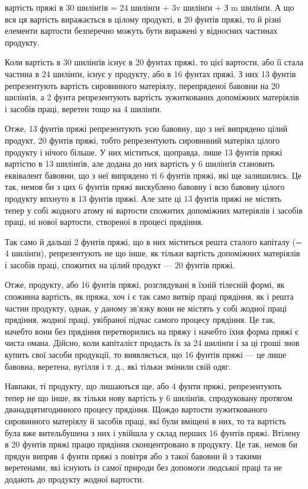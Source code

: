 вартість пряжі в 30 шилінґів = 24 шилінґи + 3v шилінґи + З m шилінґи. А що вся ця вартість
виражається в цілому продукті, в 20 фунтів пряжі, то й різні елементи вартости безперечно можуть
бути
виражені у відносних частинах продукту.

Коли вартість в 30 шилінґів існує в 20 фунтах пряжі, то  цієї вартости, або її стала частина в
24 шилінґи, існує у  продукту, або в 16 фунтах пряжі. З них 13 фунтів репрезентують вартість
сировинного матеріялу, перепряденої бавовни на 20 шилінґів, а 2 фунта репрезентують вартість
зужиткованих допоміжних матеріялів і засобів праці, веретен тощо на 4 шилінґи.

Отже, 13 фунтів пряжі репрезентують усю бавовну, що з неї випрядено цілий продукт, 20 фунтів
пряжі, тобто репрезентують сировинний матеріял цілого продукту і нічого більше. У них міститься,
щоправда, лише 13 фунтів пряжі вартістю в 13 шилінґів, але додана до них вартість у 6
шилінґів становить еквівалент бавовни, що з неї випрядено ті 6 фунтів пряжі, які ще залишились.
Це так, немов би з цих 6 фунтів пряжі вискублено бавовну і всю бавовну цілого продукту впхнуто в
13 фунтів пряжі. Але зате ці 13 фунтів пряжі не містять тепер у собі жодного атому ні
вартости спожитих допоміжних матеріялів і засобів праці, ні нової вартости, створеної в процесі
прядіння.

Так само й дальші 2 фунтів пряжі, що в них міститься решта сталого капіталу (= 4 шилінґи),
репрезентують не що інше, як
тільки вартість допоміжних матеріялів і засобів праці, спожитих на цілий продукт — 20 фунтів пряжі.

Отже,  продукту, або 16 фунтів пряжі, розглядувані в їхній тілесній формі, як споживна вартість,
як пряжа, хоч і
є так само витвір праці прядіння, як і решта частин продукту, однак, у даному зв’язку вони не
містять у собі жодної праці прядіння, жодної праці, увібраної підчас самого процесу прядіння. Це
так, начебто вони без прядіння перетворились на пряжу і начебто їхня форма пряжі є чиста омана.
Дійсно, коли капіталіст продасть їх за 24 шилінґи і за ці гроші знов купить свої засоби продукції,
то виявляється, що 16 фунтів пряжі — це лише бавовна, веретена, вугілля і т. д., які тільки змінили
свій одяг.

Навпаки, ті  продукту, що лишаються ще, або 4 фунти пряжі, репрезентують тепер не що інше, як
тільки нову вартість
у 6 шилінґів, спродуковану протягом дванадцятигодинного процесу прядіння. Щождо вартости
зужиткованого сировинного матеріялу й засобів праці, які були вміщені в них, то та вартість була вже
вительбушена з них і увійшла у склад перших 16 фунтів пряжі. Втілену в 20 фунтів пряжі працю
прядіння сконцентровано
в  продукту. Це так, немов би прядун випряв 4 фунти пряжі з повітря або з такої бавовни й з
такими веретенами, які
існують із самої природи без допомоги людської праці та не додають до продукту жодної вартости.
